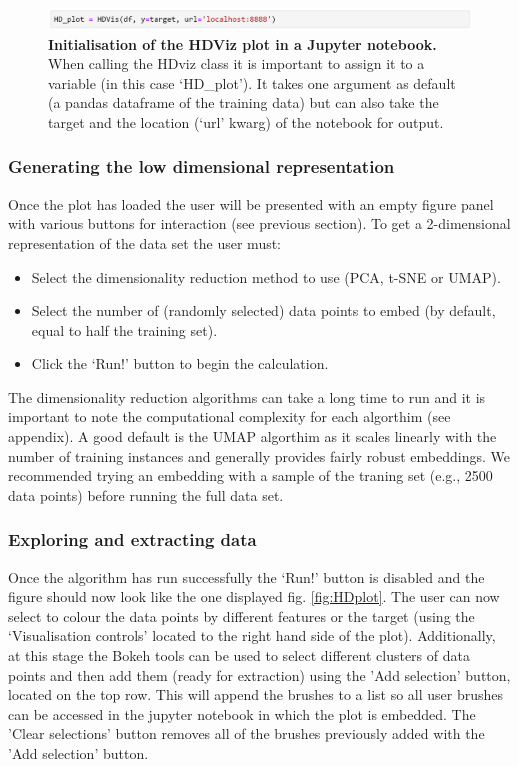 \documentclass[11pt]{article} %
\begin{document}
\begin{figure}[!h]
\centering
\includegraphics[width=5.75in]{images/HDViz_intialisation.png}
\caption{\textbf{Initialisation of the HDViz plot in a Jupyter notebook.} When calling the HDviz class it is important to assign it to a variable (in this case `HD\_plot'). It takes one argument as default (a pandas dataframe of the training data) but can also take the target and the location (`url' kwarg) of the notebook for output.}
\label{fig:HDViz_init}
\end{figure}

\subsubsection{Generating the low dimensional representation}

Once the plot has loaded the user will be presented with an empty figure panel with various buttons for interaction (see previous section).  To get a 2-dimensional representation of the data set the user must:

\begin{itemize}
\item Select the dimensionality reduction method to use (PCA, t-SNE or UMAP).
\item Select the number of (randomly selected) data points to embed (by default, equal to half the training set).
\item Click the `Run!' button to begin the calculation. 
\end{itemize}

The dimensionality reduction algorithms can take a long time to run and it is important to note the computational complexity for each algorthim (see appendix). A good default is the UMAP algorthim as it scales linearly with the number of training instances and generally provides fairly robust embeddings. We recommended trying an embedding with a sample of the traning set (e.g., 2500 data points) before running the full data set.


\subsubsection{Exploring and extracting data}

Once the algorithm has run successfully the `Run!' button is disabled and the figure should now look like the one displayed fig. \ref{fig:HDplot}. The user can now select to colour the data points by different features or the target (using the `Visualisation controls' located to the right hand side of the plot). Additionally, at this stage the Bokeh tools can be used to select different clusters of data points and then add them (ready for extraction) using the 'Add selection' button, located on the top row. This will append the brushes to a list so all user brushes can be accessed in the jupyter notebook in which the plot is embedded. The 'Clear selections' button removes all of the brushes previously added with the 'Add selection' button.
\end{document}
